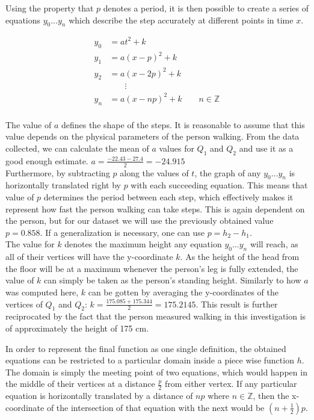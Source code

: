 \documentclass[12pt, a4paper]{article}
\begin{document}
Using the property that $p$ denotes a period, it is then possible to create a
series of equations $y_0 \dots y_n$ which describe the step accurately at different points in
time $x$.

\begin{align*}
    y_0 & = at^2 + k                                \\
    y_1 & = a(x-p)^2 + k                            \\
    y_2 & = a(x-2p)^2 + k                           \\
        & \phantom{t=\,} \vdots                     \\
    y_n & = a(x-np)^2 + k \qquad n \in \mathbb{Z} \\
\end{align*}

The value of $a$ defines the shape of the steps. It is reasonable to assume that
this value depends on the physical parameters of the person walking. From the
data collected, we can calculate the mean of $a$ values for $Q_1$ and $Q_2$ and
use it as a good enough estimate. $a = \frac{-22.43 -27.4}{2} = -24.915$ \\

Furthermore, by subtracting $p$ along the values of $t$, the graph of any $y_0
\dots y_n$ is horizontally translated right by $p$ with each succeeding
equation. This means that value of $p$ determines the period between each step,
which effectively makes it represent how fast the person walking can take steps.
This is again dependent on the person, but for our dataset we will use the
previously obtained value $p=0.858$. If a generalization is necessary, one can
use $p = h_2 - h_1$. \\

The value for $k$ denotes the maximum height any equation $y_0 \dots y_n$ will
reach, as all of their vertices will have the y-coordinate $k$. As the height of
the head from the floor will be at a maximum whenever the person's leg is fully
extended, the value of $k$ can simply be taken as the person's standing height.
Similarly to how $a$ was computed here, $k$ can be gotten by averaging the
y-coordinates of the vertices of $Q_1$ and $Q_2$: $k = \frac{175.085 +
        175.344}{2} = 175.2145$. This result is further reciprocated by the fact that
the person measured walking in this investigation is of approximately the height
of 175 cm.

In order to represent the final function as one single definition, the obtained
equations can be restricted to a particular domain inside a piece wise
function $h$. The domain is simply the meeting point of two equations, which
would happen in the middle of their vertices at a distance $\frac{p}{2}$ from
either vertex. If any particular equation is horizontally translated by a
distance of $np$ where $n \in \mathbb{Z}$, then the x-coordinate of the
intersection of that equation with the next would be $(n+\frac{1}{2})p$. \\
\end{document}
